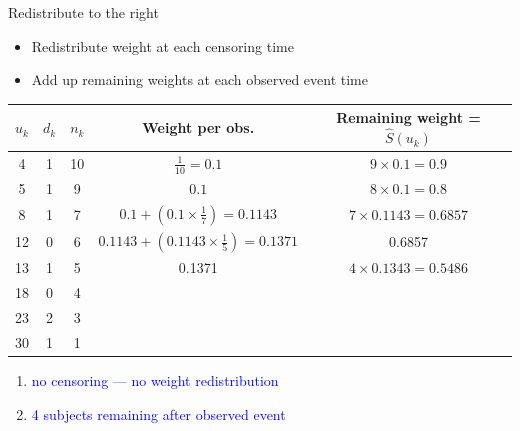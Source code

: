 \documentclass[10pt,t]{beamer}
\begin{document}
\begin{frame}{Redistribute to the right}
	\begin{itemize}
		\item Redistribute weight at each censoring time
		\item Add up remaining weights at each observed event time
	\end{itemize}
	\begin{footnotesize}
		\begin{tabular}{|c|c|c|c|c|}
			\hline
			$u_k$ & $d_k$ & $n_k$ & Weight per obs. & Remaining weight = $\widehat{S}(u_k)$ \\
			\hline
			4 & 1 & 10 & $\frac{1}{10} = 0.1$ & $9\times 0.1= 0.9$\\
			5 & 1 & 9 & $0.1$ &  $8\times 0.1= 0.8$  \\
			8 & 1 & 7 & $0.1 + (0.1\times \frac{1}{7}) = 0.1143$ & $7 \times 0.1143 = 0.6857$\\
			12 & 0 & 6 & $0.1143 +  (0.1143\times\frac{1}{5}) = 0.1371$ &  0.6857\\
			13 & 1 & 5 & 0.1371 & $4 \times 0.1343 =0.5486 $\\
			18 & 0 & 4 & & \\
			23 & 2 & 3 & & \\
			30 & 1 & 1 & & \\
			\hline
		\end{tabular}
	\end{footnotesize}
	\begin{enumerate}
		\item \textcolor{blue}{no censoring --- no weight redistribution}
		\item \textcolor{blue}{4 subjects remaining after observed event}
	\end{enumerate}
\end{frame}
\end{document}
